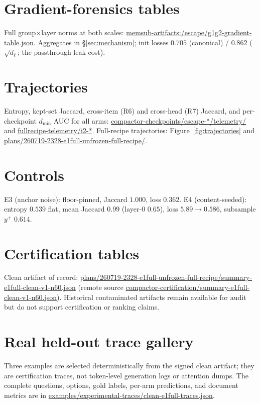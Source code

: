 \documentclass[11pt]{article}
\newcommand{\dl}{d_{\ell}}
\begin{document}



\appendix

\section{Gradient-forensics tables}
Full group$\times$layer norms at both scales:
\url{memsub-artifacts:/escape/g1g2-gradient-table.json}. Aggregates in
\S\ref{sec:mechanism}; init losses $0.705$ (canonical) / $0.862$
($\sqrt{\dl}$; the passthrough-leak cost).

\section{Trajectories}
Entropy, kept-set Jaccard, cross-item (R6) and cross-head (R7) Jaccard,
and per-checkpoint $d_{\min}$ AUC for all arms:
\url{compactor-checkpoints/escape-*/telemetry/} and
\url{fullrecipe-telemetry/i2-*}. Full-recipe trajectories: Figure~\ref{fig:trajectories} and
\url{plans/260719-2328-e1full-unfrozen-full-recipe/}.

\section{Controls}
E3 (anchor noise): floor-pinned, Jaccard $1.000$, loss $0.362$.
E4 (content-seeded): entropy $0.539$ flat, mean Jaccard $0.99$
(layer-0 $0.65$), loss $5.89 \to 0.586$, subsample $y^{+}$ $0.614$.

\section{Certification tables}
Clean artifact of record:
\url{plans/260719-2328-e1full-unfrozen-full-recipe/summary-e1full-clean-v1-n60.json}
(remote source \url{compactor-certification/summary-e1full-clean-v1-n60.json}).
Historical contaminated artifacts remain available for audit but do not
support certification or ranking claims.

\section{Real held-out trace gallery}
Three examples are selected deterministically from the signed clean artifact;
they are certification traces, not token-level generation logs or attention
dumps. The complete questions, options, gold labels, per-arm predictions, and
document metrics are in
\url{examples/experimental-traces/clean-e1full-traces.json}.
\end{document}
